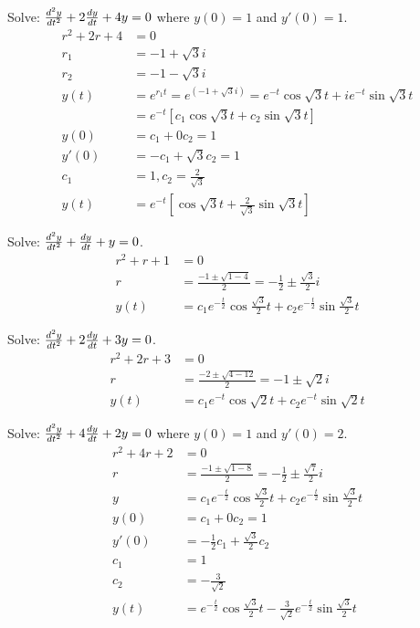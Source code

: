\documentclass[12pt]{article}
\begin{document}
\begin{example} Solve: $\frac{d^2y}{dt^2} + 2\frac{dy}{dt} + 4y = 0$ where $y(0) = 1$ and $y'(0) = 1$. $$\begin{aligned} r^2 + 2r + 4 &= 0 \\ r_1 &= -1 + \sqrt{3}i \\ r_2 &= -1 - \sqrt{3}i \\ y(t) &= e^{r_1t} = e^{(-1 + \sqrt{3}i)} = e^{-t}\cos \sqrt{3}t + ie^{-t} \sin \sqrt{3}t \\ &= e^{-t}[c_1\cos \sqrt{3}t + c_2\sin \sqrt{3}t] \\ y(0) &= c_1 + 0c_2 = 1 \\ y'(0) &= -c_1 + \sqrt{3}c_2 = 1 \\ c_1 &= 1,c_2 = \frac{2}{\sqrt{3}} \\ y(t) &= e^{-t}[\cos \sqrt{3}t + \frac{2}{\sqrt{3}}\sin \sqrt{3}t] \end{aligned} $$ \end{example} 
\begin{example} Solve: $\frac{d^2y}{dt^2} + \frac{dy}{dt}+ y = 0$. $$\begin{aligned} r^2 + r + 1 &= 0 \\ r &= \frac{-1 \pm \sqrt{1 - 4}}{2} = -\frac{1}{2} \pm \frac{\sqrt{3}}{2}i \\ y(t) &= c_1e^{-\frac{t}{2}}\cos \frac{\sqrt{3}}{2}t + c_2e^{-\frac{t}{2}}\sin\frac{\sqrt{3}}{2}t \end{aligned} $$ \end{example} 
\begin{example} Solve: $\frac{d^2y}{dt^2} + 2\frac{dy}{dt}+ 3y = 0$. $$\begin{aligned} r^2 + 2r + 3 &= 0 \\ r &= \frac{-2 \pm \sqrt{4 - 12}}{2} = -1 \pm \sqrt{2}i \\ y(t) &= c_1e^{-t}\cos \sqrt{2}t + c_2e^{-t}\sin \sqrt{2}t \end{aligned} $$ \end{example} 
\begin{example} Solve: $\frac{d^2y}{dt^2} + 4\frac{dy}{dt}+ 2y = 0$ where $y(0) = 1$ and $y'(0) = 2$. $$\begin{aligned} r^2 + 4r + 2 &= 0 \\ r&= \frac{-1 \pm \sqrt{1 - 8}}{2} = -\frac{1}{2} \pm \frac{\sqrt{7}}{2}i \\ y &= c_1e^{-\frac{t}{2}}\cos \frac{\sqrt{3}}{2}t + c_2e^{-\frac{t}{2}}\sin \frac{\sqrt{3}}{2}t \\ y(0) &= c_1 + 0c_2 = 1 \\ y'(0) &= -\frac{1}{2}c_1 + \frac{\sqrt{3}}{2}c_2 \\ c_1 &= 1 \\ c_2 &= -\frac{3}{\sqrt{2}} \\ y(t) &= e^{-\frac{t}{2}}\cos \frac{\sqrt{3}}{2}t - \frac{3}{\sqrt{2}}e^{-\frac{t}{2}}\sin \frac{\sqrt{3}}{2}t \end{aligned} $$ \end{example} 
\end{document}
